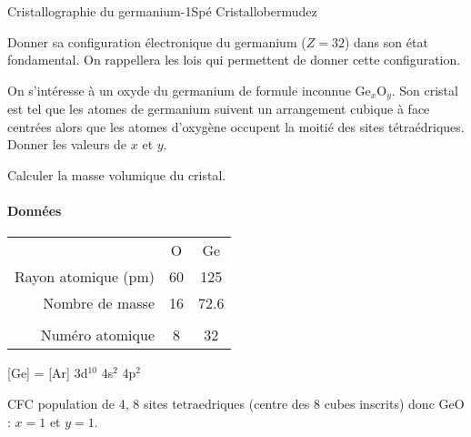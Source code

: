 \begin{exercise}{Cristallographie du germanium}{-1}{Spé}
{Cristallo}{bermudez}

\begin{questions}

    \question  Donner sa configuration électronique du germanium ($Z = 32$) dans son état fondamental. On rappellera les lois qui permettent de donner cette configuration.
    
    \question On s'intéresse à un oxyde du germanium de formule inconnue Ge$_x$O$_y$. Son cristal est tel que les atomes de germanium suivent un arrangement cubique à face centrées alors que les atomes d'oxygène occupent la moitié des sites tétraédriques.
    Donner les valeurs de $x$ et $y$.

    \question Calculer la masse volumique du cristal.
\end{questions}

\paragraph{Données}
\begin{center}
\begin{tabular}{rcc}
    \hline
     & O & Ge \\
    Rayon atomique (pm) & 60 & 125\\
    Nombre de masse & 16 & 72.6 \\ \hline\hline \\
    Numéro atomique & 8 & 32 \\ \hline\hline 
\end{tabular}
\end{center}

\end{exercise}

\begin{solution}

[Ge] = [Ar] 3d$^{10}$ 4s$^2$ 4p$^2$

CFC population de 4, 8 sites tetraedriques (centre des 8 cubes inscrits) donc GeO : $x=1$ et $y=1$.

\end{solution}